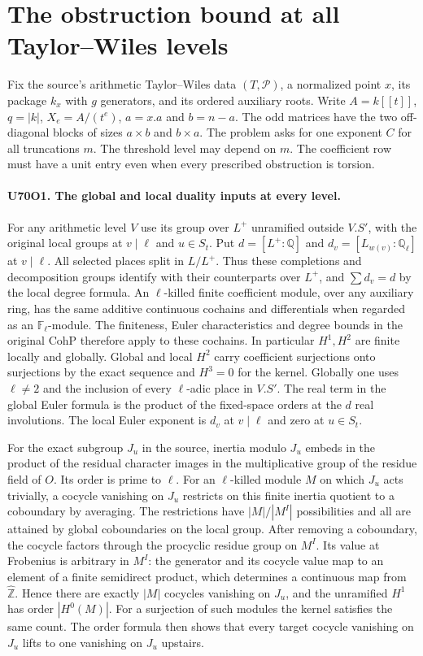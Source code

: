 \section{The obstruction bound at all Taylor--Wiles levels}

Fix the source's arithmetic Taylor--Wiles data $(T,\mathcal P)$,
a normalized point $x$, its package $k_x$ with $g$ generators,
and its ordered auxiliary roots. Write $A=k[[t]]$, $q=|k|$,
$X_e=A/(t^e)$, $a=x.a$ and $b=n-a$. The odd matrices have the
two off-diagonal blocks of sizes $a\times b$ and $b\times a$.
The problem asks for one exponent $C$ for all truncations $m$.
The threshold level may depend on $m$. The coefficient row must have
a unit entry even when every prescribed obstruction is torsion.

\paragraph{U70O1. The global and local duality inputs at every level.}
For any arithmetic level $V$ use its group over $L^+$ unramified
outside $V.S'$, with the original local groups at $v\mid\ell$
and $u\in S_t$. Put $d=[L^+:\mathbb Q]$ and
$d_v=[L_{w(v)}:\mathbb Q_\ell]$ at $v\mid\ell$.
All selected places split in $L/L^+$. Thus these completions and
decomposition groups identify with their counterparts over $L^+$,
and $\sum d_v=d$ by the local degree formula. An $\ell$-killed
finite coefficient module, over any auxiliary ring, has the same
additive continuous cochains and differentials when regarded as an
$\mathbb F_\ell$-module. The finiteness, Euler characteristics and
degree bounds in the original $\mathrm{CohP}$ therefore apply to
these cochains. In particular $H^1,H^2$ are finite locally and
globally. Global and local $H^2$ carry coefficient surjections
onto surjections by the exact sequence and $H^3=0$ for the kernel.
Globally one uses $\ell\ne2$ and the inclusion of every
$\ell$-adic place in $V.S'$. The real term in the global Euler
formula is the product of the fixed-space orders at the $d$ real
involutions. The local Euler exponent is $d_v$ at $v\mid\ell$
and zero at $u\in S_t$.

For the exact subgroup $J_u$ in the source, inertia modulo $J_u$
embeds in the product of the residual character images in the
multiplicative group of the residue field of $O$. Its order is prime
to $\ell$. For an $\ell$-killed module $M$ on which $J_u$ acts
trivially, a cocycle vanishing on $J_u$ restricts on this finite
inertia quotient to a coboundary by averaging. The restrictions
have $|M|/|M^I|$ possibilities and all are attained by global
coboundaries on the local group. After removing a coboundary,
the cocycle factors through the procyclic residue group on $M^I$.
Its value at Frobenius is arbitrary in $M^I$: the generator and
its cocycle value map to an element of a finite semidirect product,
which determines a continuous map from $\widehat{\mathbb Z}$.
Hence there are exactly $|M|$ cocycles vanishing on $J_u$, and the
unramified $H^1$ has order $|H^0(M)|$. For a surjection of such
modules the kernel satisfies the same count. The order formula
then shows that every target cocycle vanishing on $J_u$ lifts to
one vanishing on $J_u$ upstairs.

